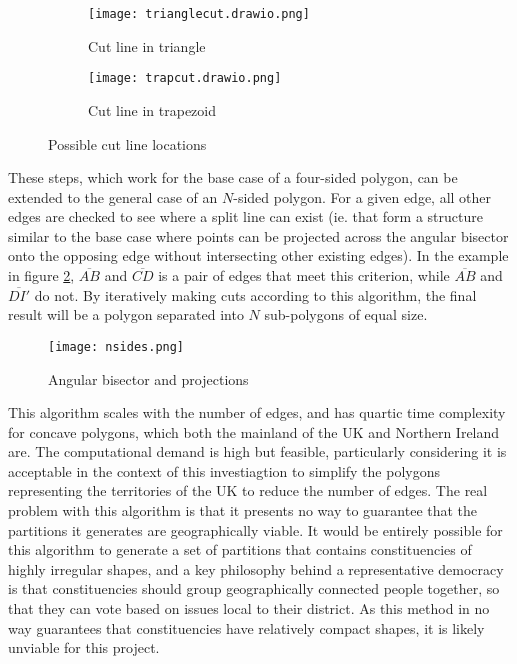\documentclass{article}
\begin{document}
\begin{figure}[h]
    \centering
    \begin{subfigure}{0.48\textwidth}
        \centering
        \texttt{[image: trianglecut.drawio.png]}
        \caption{Cut line in triangle}
    \end{subfigure}
    \begin{subfigure}{0.48\textwidth}
        \centering
        \texttt{[image: trapcut.drawio.png]}
        \caption{Cut line in trapezoid}
    \end{subfigure}
    \caption{Possible cut line locations}
    \label{fig:cutlocations}
\end{figure}

These steps, which work for the base case of a four-sided polygon, can be extended to the general case of an $N$-sided polygon. For a given edge, all other edges
are checked to see where a split line can exist (ie. that form a structure similar to the base case where points can be projected across the angular bisector onto
the opposing edge without intersecting other existing edges). In the example in figure \ref{fig:nsides}, $\overline{AB}$ and $\overline{CD}$ is a pair of edges that meet this criterion,
while $\overline{AB}$ and $\overline{DI'}$ do not. By iteratively making cuts according to this algorithm, the final result will be a polygon separated into $N$ sub-polygons of equal size.

\begin{figure}[H]
    \centering
    \texttt{[image: nsides.png]}
    \caption{Angular bisector and projections \cite{khetarpal}}
    \label{fig:nsides}
\end{figure}

This algorithm scales with the number of edges, and has quartic time complexity for concave polygons, which both the mainland of the UK and Northern Ireland are.
The computational demand is high but feasible, particularly considering it is acceptable in the context of this investiagtion to simplify the polygons representing the territories of the UK 
to reduce the number of edges. The real problem with this algorithm is that it presents no way to guarantee that the partitions it generates are geographically viable.
It would be entirely possible for this algorithm to generate a set of partitions that contains constituencies of highly irregular shapes, and a key philosophy behind a representative democracy is that
constituencies should group geographically connected people together, so that they can vote based on issues local to their district. As this method in no way guarantees that constituencies have
relatively compact shapes, it is likely unviable for this project.
\end{document}
